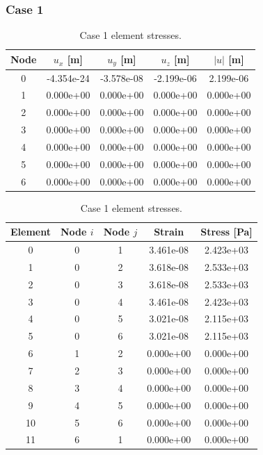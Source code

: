 \documentclass{article}
\begin{document}
\subsubsection*{Case 1}
\begin{table}[htbp]
\centering
\scriptsize
\begin{minipage}[t]{0.48\textwidth}
\centering
\caption{Case 1 nodal displacements.}
\begin{tabular}{c c c c c}
\toprule
Node & $u_x$ [m] & $u_y$ [m] & $u_z$ [m] & $|u|$ [m] \\
\midrule
0 & -4.354e-24 & -3.578e-08 & -2.199e-06 & 2.199e-06 \\
1 & 0.000e+00 & 0.000e+00 & 0.000e+00 & 0.000e+00 \\
2 & 0.000e+00 & 0.000e+00 & 0.000e+00 & 0.000e+00 \\
3 & 0.000e+00 & 0.000e+00 & 0.000e+00 & 0.000e+00 \\
4 & 0.000e+00 & 0.000e+00 & 0.000e+00 & 0.000e+00 \\
5 & 0.000e+00 & 0.000e+00 & 0.000e+00 & 0.000e+00 \\
6 & 0.000e+00 & 0.000e+00 & 0.000e+00 & 0.000e+00 \\
\bottomrule
\end{tabular}
\end{minipage}\hfill
\begin{minipage}[t]{0.48\textwidth}
\centering
\caption{Case 1 element stresses.}
\begin{tabular}{c c c c c}
\toprule
Element & Node $i$ & Node $j$ & Strain & Stress [Pa] \\
\midrule
0 & 0 & 1 & 3.461e-08 & 2.423e+03 \\
1 & 0 & 2 & 3.618e-08 & 2.533e+03 \\
2 & 0 & 3 & 3.618e-08 & 2.533e+03 \\
3 & 0 & 4 & 3.461e-08 & 2.423e+03 \\
4 & 0 & 5 & 3.021e-08 & 2.115e+03 \\
5 & 0 & 6 & 3.021e-08 & 2.115e+03 \\
6 & 1 & 2 & 0.000e+00 & 0.000e+00 \\
7 & 2 & 3 & 0.000e+00 & 0.000e+00 \\
8 & 3 & 4 & 0.000e+00 & 0.000e+00 \\
9 & 4 & 5 & 0.000e+00 & 0.000e+00 \\
10 & 5 & 6 & 0.000e+00 & 0.000e+00 \\
11 & 6 & 1 & 0.000e+00 & 0.000e+00 \\
\bottomrule
\end{tabular}
\end{minipage}
\end{table}
\end{document}
